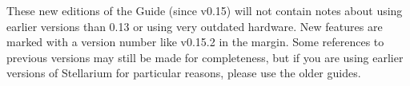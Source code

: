 These new editions of the Guide (since v0.15) will not contain notes about using
earlier versions than 0.13 or using very outdated hardware. 
New features are marked with a version number like v0.15.2 in the margin. 
Some references to previous versions may still be made for completeness, 
but if you are using earlier versions of Stellarium 
for particular reasons, please use the older guides.


